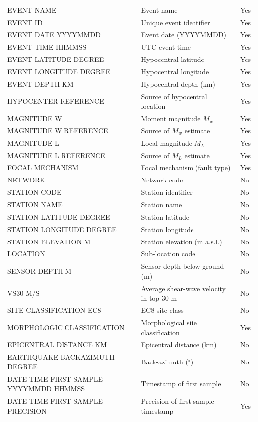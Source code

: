\begin{longtable}{
  >{\raggedright\arraybackslash}p{4cm}  >{\raggedright\arraybackslash}p{8cm}  >{\centering\arraybackslash}p{2cm}
}
EVENT NAME & Event name & Yes \\
EVENT ID & Unique event identifier & Yes \\
EVENT DATE YYYYMMDD & Event date (YYYYMMDD) & Yes \\
EVENT TIME HHMMSS & UTC event time & Yes \\
EVENT LATITUDE DEGREE & Hypocentral latitude & Yes \\
EVENT LONGITUDE DEGREE & Hypocentral longitude & Yes \\
EVENT DEPTH KM & Hypocentral depth (km) & Yes \\
HYPOCENTER REFERENCE & Source of hypocentral location & Yes \\
MAGNITUDE W & Moment magnitude $M_w$ & Yes \\
MAGNITUDE W REFERENCE & Source of $M_w$ estimate & Yes \\
MAGNITUDE L & Local magnitude $M_L$ & Yes \\
MAGNITUDE L REFERENCE & Source of $M_L$ estimate & Yes \\
FOCAL MECHANISM & Focal mechanism (fault type) & Yes \\
NETWORK & Network code & No \\
STATION CODE & Station identifier & No \\
STATION NAME & Station name & No \\
STATION LATITUDE DEGREE & Station latitude & No \\
STATION LONGITUDE DEGREE & Station longitude & No \\
STATION ELEVATION M & Station elevation (m a.s.l.) & No \\
LOCATION & Sub-location code & No \\
SENSOR DEPTH M & Sensor depth below ground (m) & No \\
VS30 M/S & Average shear-wave velocity in top 30 m & No \\
SITE CLASSIFICATION EC8 & EC8 site class & No \\
MORPHOLOGIC CLASSIFICATION & Morphological site classification & Yes \\
EPICENTRAL DISTANCE KM & Epicentral distance (km) & No \\
EARTHQUAKE BACKAZIMUTH DEGREE & Back-azimuth ($^\circ$) & No \\
DATE TIME FIRST SAMPLE YYYYMMDD HHMMSS & Timestamp of first sample & No \\
DATE TIME FIRST SAMPLE PRECISION & Precision of first sample timestamp & Yes \\

\end{longtable}
